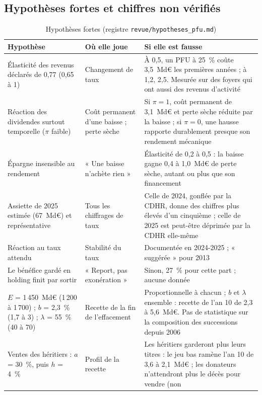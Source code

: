 \subsection{Hypothèses fortes et chiffres non vérifiés}

\begin{table}[!htbp]\centering\scriptsize
\caption{Hypothèses fortes (registre \texttt{revue/hypotheses\_pfu.md})}\label{tab:pfu_a_hyp}
\begin{tabularx}{\linewidth}{@{}>{\raggedright\arraybackslash}p{4.4cm}>{\raggedright\arraybackslash}p{3.3cm}>{\raggedright\arraybackslash}X@{}}
\toprule
Hypothèse & Où elle joue & Si elle est fausse \\
\midrule
Élasticité des revenus déclarés de 0,77 (0,65 à 1) & Changement de taux & À 0,5, un PFU à 25~\% coûte 3,5~Md€ les
premières années ; à 1,2, 2,5. Mesurée sur des foyers qui ont aussi des revenus d'activité \\
Réaction des dividendes surtout temporelle ($\pi$ faible) & Coût permanent d'une baisse ; perte sèche & Si
$\pi = 1$, coût permanent de 3,1~Md€ et perte sèche réduite par la baisse ; si $\pi = 0$, une hausse rapporte
durablement presque son rendement mécanique \\
Épargne insensible au rendement & « Une baisse n'achète rien » & Élasticité de 0,2 à 0,5 : la baisse gagne 0,4 à
1,0~Md€ de perte sèche, autant ou plus que son financement \\
Assiette de 2025 estimée (67~Md€) et représentative & Tous les chiffrages de taux & Celle de 2024, gonflée par la
CDHR, donne des chiffres plus élevés d'un cinquième ; celle de 2025 est peut-être déprimée par la CDHR elle-même \\
Réaction au taux attendu & Stabilité du taux & Documentée en 2024-2025 ; « suggérée » pour 2013 \\
Le bénéfice gardé en holding finit par sortir & « Report, pas exonération » & Sinon, 27~\% pour cette part ; aucune
donnée \\
$E$ = 1\,450~Md€ (1\,200 à 1\,700) ; $b$ = 2,3~\% (1,7 à 3) ; $\lambda$ = 55~\% (40 à 70) & Recette de la fin de
l'effacement & Proportionnelle à chacun ; $b$ et $\lambda$ ensemble : recette de l'an 10 de 2,3 à 5,6~Md€. Pas de
statistique sur la composition des successions depuis 2006 \\
Ventes des héritiers : $a$ = 30~\%, puis $h$ = 4~\% & Profil de la recette & Les héritiers garderont plus leurs
titres : le jeu bas ramène l'an 10 de 3,6 à 2,1~Md€ ; les donateurs n'attendront plus le décès pour vendre (non

\end{tabularx}
\end{table}
